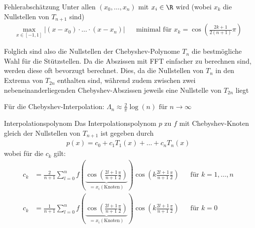 \begin{theorem}[]{Fehlerabschätzung}
	Unter allen $(x_0, \ldots, x_n)$ mit $x_i \in \R$ wird (wobei $x_k$ die Nullstellen von $T_{n + 1}$ sind)
	\rmvspace
	\begin{align*}
		\max_{x \in [-1, 1]} |(x - x_0) \cdot \ldots \cdot (x - x_n)| &  & \text{minimal für } x_k = \cos \left( \frac{2k + 1}{2(n + 1)}\pi \right)
	\end{align*}
\end{theorem}

Folglich sind also die Nullstellen der Chebyshev-Polynome $T_n$ die bestmögliche Wahl für die Stützstellen.
Da die Abszissen mit FFT einfacher zu berechnen sind, werden diese oft bevorzugt berechnet.
Dies, da die Nullstellen von $T_n$ in den Extrema von $T_{2n}$ enthalten sind, während zudem zwischen zwei nebeneinanderliegenden Chebyshev-Abszissen jeweils eine Nullstelle von $T_{2n}$ liegt

 Für die Chebyshev-Interpolation: $\displaystyle \Lambda_n \approx \frac{2}{\pi} \log(n) \text{ für } n \rightarrow \infty$


\begin{theorem}[]{Interpolationspolynom}
	Das Interpolationspolynom $p$ zu $f$ mit Chebyshev-Knoten gleich der Nullstellen von $T_{n + 1}$ ist gegeben durch
	\begin{align*}
		p(x) = c_0 + c_1 T_1(x) + \ldots + c_n T_n(x)
	\end{align*}
	wobei für die $c_k$ gilt:
	\begin{align*}
		c_k                                                      & = \frac{2}{n + 1} \sum_{l = 0}^{n} f\left( \underbrace{\cos \left( \frac{2l + 1}{n + 1} \frac{\pi}{2} \right)}_{= x_i (\text{Knoten})} \right)
		\cos \left( k \frac{2l + 1}{n + 1} \frac{\pi}{2} \right) &                                                                                                                                                & \text{für } k = 1, \ldots, n \\
		c_k                                                      & = \frac{1}{n + 1} \sum_{l = 0}^{n} f\left( \underbrace{\cos \left( \frac{2l + 1}{n + 1} \frac{\pi}{2} \right)}_{= x_i (\text{Knoten})} \right)
		\cos \left( k \frac{2l + 1}{n + 1} \frac{\pi}{2} \right) &                                                                                                                                                & \text{für } k = 0
	\end{align*}
\end{theorem}

